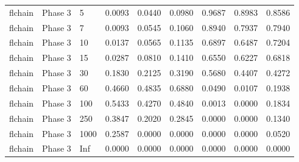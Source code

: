 \begin{tabular}{lllllllll}
  flchain & Phase 3 & 5 & 0.0093 & 0.0440 & 0.0980 & 0.9687 & 0.8983 & 0.8586 \\ 
  flchain & Phase 3 & 7 & 0.0093 & 0.0545 & 0.1060 & 0.8940 & 0.7937 & 0.7940 \\ 
  flchain & Phase 3 & 10 & 0.0137 & 0.0565 & 0.1135 & 0.6897 & 0.6487 & 0.7204 \\ 
  flchain & Phase 3 & 15 & 0.0287 & 0.0810 & 0.1410 & 0.6550 & 0.6227 & 0.6818 \\ 
  flchain & Phase 3 & 30 & 0.1830 & 0.2125 & 0.3190 & 0.5680 & 0.4407 & 0.4272 \\ 
  flchain & Phase 3 & 60 & 0.4660 & 0.4835 & 0.6880 & 0.0490 & 0.0107 & 0.1938 \\ 
  flchain & Phase 3 & 100 & 0.5433 & 0.4270 & 0.4840 & 0.0013 & 0.0000 & 0.1834 \\ 
  flchain & Phase 3 & 250 & 0.3847 & 0.2020 & 0.2845 & 0.0000 & 0.0000 & 0.1340 \\ 
  flchain & Phase 3 & 1000 & 0.2587 & 0.0000 & 0.0000 & 0.0000 & 0.0000 & 0.0520 \\ 
  flchain & Phase 3 & Inf & 0.0000 & 0.0000 & 0.0000 & 0.0000 & 0.0000 & 0.0000 \\ 
   \bottomrule
\end{tabular}
